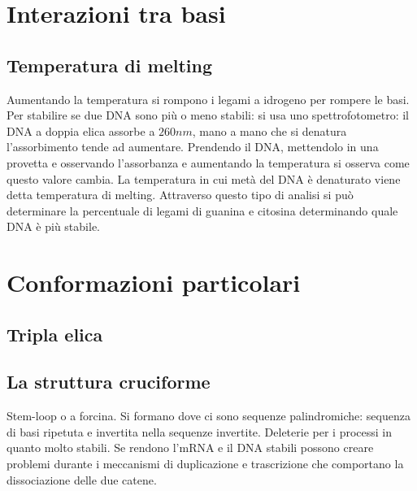 \section{Interazioni tra basi}
\subsection{Temperatura di melting}
Aumentando la temperatura si rompono i legami a idrogeno per rompere le basi. Per stabilire se due DNA sono pi\`u o meno stabili: si usa uno spettrofotometro: il DNA a doppia elica 
assorbe a $260 nm$, mano a mano che si denatura l'assorbimento tende ad aumentare. Prendendo il DNA, mettendolo in una provetta e osservando l'assorbanza e aumentando la temperatura si 
osserva come questo valore cambia. La temperatura in cui met\`a del DNA \`e denaturato viene detta temperatura di melting. Attraverso questo tipo di analisi si pu\`o determinare la 
percentuale di legami di guanina e citosina determinando quale DNA \`e pi\`u stabile. 
\section{Conformazioni particolari}
\subsection{Tripla elica}
\subsection{La struttura cruciforme}
Stem-loop o a forcina. Si formano dove ci sono sequenze palindromiche: sequenza di basi ripetuta e invertita nella sequenze invertite. Deleterie per i processi in quanto molto stabili. 
Se rendono l'mRNA e il DNA stabili possono creare problemi durante i meccanismi di duplicazione e trascrizione che comportano la dissociazione delle due catene.
